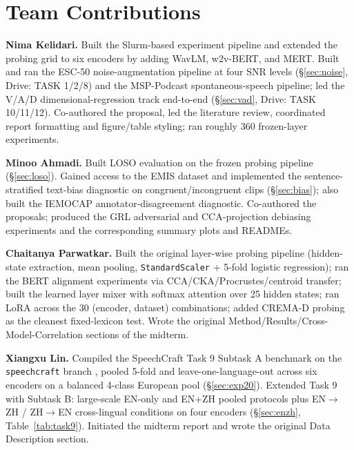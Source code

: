 \documentclass[sigconf,screen]{acmart}
\begin{document}
\section{Team Contributions}
\textbf{Nima Kelidari.} Built the Slurm-based experiment pipeline and extended the probing grid to six encoders by adding WavLM, w2v-BERT, and MERT. Built and ran the ESC-50 noise-augmentation pipeline at four SNR levels (\S\ref{sec:noise}, Drive: TASK 1/2/8) and the MSP-Podcast spontaneous-speech pipeline; led the V/A/D dimensional-regression track end-to-end (\S\ref{sec:vad}, Drive: TASK 10/11/12). Co-authored the proposal, led the literature review, coordinated report formatting and figure/table styling; ran roughly 360 frozen-layer experiments.

\textbf{Minoo Ahmadi.} Built LOSO evaluation on the frozen probing pipeline (\S\ref{sec:loso}). Gained access to the EMIS dataset and implemented the sentence-stratified text-bias diagnostic on congruent/incongruent clips (\S\ref{sec:bias}); also built the IEMOCAP annotator-disagreement diagnostic. Co-authored the proposals; produced the GRL adversarial and CCA-projection debiasing experiments and the corresponding summary plots and READMEs.

\textbf{Chaitanya Parwatkar.} Built the original layer-wise probing pipeline (hidden-state extraction, mean pooling, \texttt{StandardScaler} + 5-fold logistic regression); ran the BERT alignment experiments via CCA/CKA/Procrustes/centroid transfer; built the learned layer mixer with softmax attention over 25 hidden states; ran LoRA across the 30 (encoder, dataset) combinations; added CREMA-D probing as the cleanest fixed-lexicon test. Wrote the original Method/Results/Cross-Model-Correlation sections of the midterm.

\textbf{Xiangxu Lin.} Compiled the SpeechCraft Task 9 Subtask A benchmark on the \texttt{speechcraft} branch , pooled 5-fold and leave-one-language-out across six encoders on a balanced 4-class European pool (\S\ref{sec:exp20}). Extended Task 9 with Subtask B: large-scale EN-only and EN+ZH pooled protocols plus EN$\to$ZH / ZH$\to$EN cross-lingual conditions on four encoders (\S\ref{sec:enzh}, Table~\ref{tab:task9}). Initiated the midterm report and wrote the original Data Description section.
\end{document}
